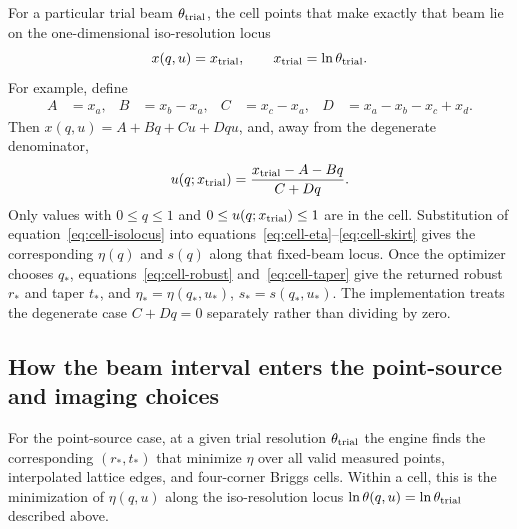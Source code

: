 \documentclass[11pt]{article}
\begin{document}
For a particular trial beam $\theta_{\rm trial}$, the cell points that make exactly that
beam lie on the one-dimensional iso-resolution locus
\begin{equation}
 x(q,u)=x_{\rm trial},\qquad x_{\rm trial}=\ln\theta_{\rm trial}.
 \label{eq:iso-resolution}
\end{equation}
For example, define
\begin{align*}
 A&=x_a,&B&=x_b-x_a,&C&=x_c-x_a,&
 D&=x_a-x_b-x_c+x_d.
\end{align*}
Then $x(q,u)=A+Bq+Cu+Dqu$, and, away from the degenerate denominator,
\begin{equation}
 u(q;x_{\rm trial})=\frac{x_{\rm trial}-A-Bq}{C+Dq}.
 \label{eq:cell-isolocus}
\end{equation}
Only values with $0\le q\le1$ and $0\le u(q;x_{\rm trial})\le1$ are in the cell.
Substitution of equation~\eqref{eq:cell-isolocus} into
equations~\eqref{eq:cell-eta}--\eqref{eq:cell-skirt} gives the corresponding
$\eta(q)$ and $s(q)$ along that fixed-beam locus.  Once the optimizer chooses
$q_*$, equations~\eqref{eq:cell-robust} and~\eqref{eq:cell-taper} give the
returned robust $r_*$ and taper $t_*$, and
$\eta_*=\eta(q_*,u_*)$, $s_*=s(q_*,u_*)$.  The implementation treats the
degenerate case $C+Dq=0$ separately rather than dividing by zero.

\subsection{How the beam interval enters the point-source and imaging choices}

For the point-source case, at a given trial resolution
$\theta_{\rm trial}$ the engine finds the corresponding $(r_*,t_*)$ that
minimize $\eta$ over all valid measured points, interpolated lattice edges,
and four-corner Briggs cells.  Within a cell, this is the minimization of
$\eta(q,u)$ along the iso-resolution locus
$\ln\theta(q,u)=\ln\theta_{\rm trial}$ described above.
\end{document}
